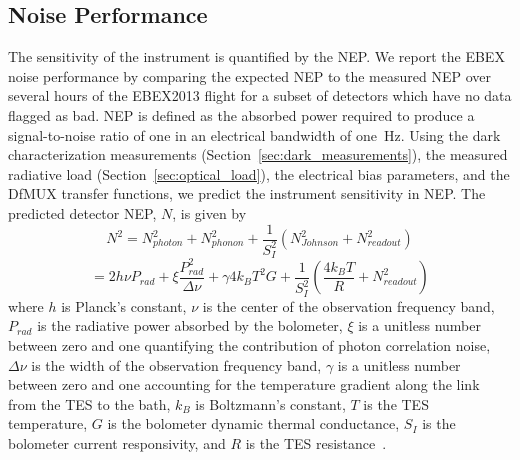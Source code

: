 \documentclass[../EBEXPaper2.tex]{subfiles}
\begin{document}
\subsection{Noise Performance}
\label{sec:noise_performance}


The sensitivity of the instrument is quantified by the \ac{NEP}. 
We report the \ac{EBEX} noise performance by comparing the expected \ac{NEP} to the measured \ac{NEP} over several hours of the \ac{EBEX2013} flight for a subset of detectors which have no data flagged as bad. 
\ac{NEP} is defined as the absorbed power required to produce a signal-to-noise ratio of one in an electrical bandwidth of one~Hz. 
Using the dark characterization measurements (Section~\ref{sec:dark_measurements}), the measured radiative load (Section~\ref{sec:optical_load}), the electrical bias parameters, and the \ac{DfMUX} transfer functions, we predict the instrument sensitivity in \ac{NEP}. 
The predicted detector \ac{NEP}, $N$, is given by 
\begin{equation}
N^{2} = N_{photon}^2 + N_{phonon}^2 + \frac{1}{S_I^2} ( N_{Johnson}^2 + N_{readout}^2 )
\end{equation}
\begin{equation}
= 2h\nu P_{rad} + \xi \frac{P_{rad}^2}{\Delta \nu} + \gamma 4k_{B} T^2 G + \frac{1}{S_I^2} (\frac{4k_BT}{R} + N_{readout}^2 )
\end{equation}
where $h$ is Planck's constant, $\nu$ is the center of the observation frequency band, $P_{rad}$ is the radiative power absorbed by the bolometer, $\xi$ is a unitless number between zero and one quantifying the contribution of photon correlation noise, $\Delta \nu$ is the width of the observation frequency band, $\gamma$ is a unitless number between zero and one accounting for the temperature gradient along the link from the \ac{TES} to the bath, $k_{B}$ is Boltzmann's constant, $T$ is the \ac{TES} temperature, $G$ is the bolometer dynamic thermal conductance, $S_{I}$ is the bolometer current responsivity, and $R$ is the \ac{TES} resistance~\citep{mather_appliedoptics_1982}. 
\end{document}
